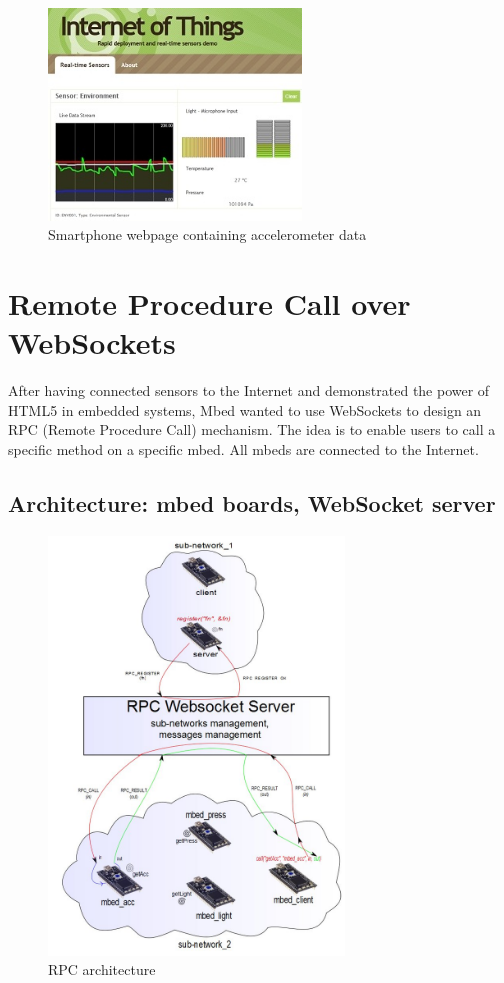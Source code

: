 \documentclass[pdftex,10pt,a4paper]{report}
\begin{document}
\begin{figure}[h!]
		\centering
		\includegraphics[width=0.6\textwidth]{./dashboard.jpg}
		\caption{Smartphone webpage containing accelerometer data}
		\label{Smartphone webpage containing accelerometer data}
\end{figure}



\newpage

\section{Remote Procedure Call over WebSockets}
After having connected sensors to the Internet and demonstrated the power of HTML5 in embedded systems, Mbed wanted to use WebSockets to design an RPC (Remote Procedure Call) mechanism. The idea is to enable users to call a specific method on a specific mbed. All mbeds are connected to the Internet.

\subsection{Architecture: mbed boards, WebSocket server}

\begin{figure}[h!]
		\centering
		\includegraphics[width=0.7\textwidth]{./rpc-1.jpg}
		\caption{RPC architecture}
		\label{RPC architecture}
\end{figure}
\end{document}
